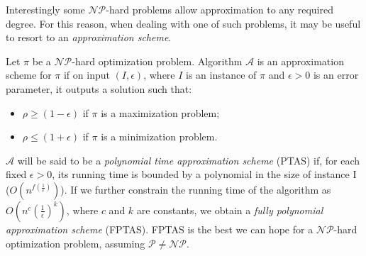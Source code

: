 Interestingly some $\mathcal{NP}$-hard problems allow approximation to any required degree. For this reason, when dealing with one of such problems, it may be useful to resort to an \textit{approximation scheme}.
\begin{definition}
	Let $\pi$ be a $\mathcal{NP}$-hard optimization problem. Algorithm $\mathcal{A}$ is an approximation scheme for $\pi$ if on input $(I,\epsilon)$, where $I$ is an instance of $\pi$ and $\epsilon> 0$ is an error parameter, it outputs a solution such that:
	\begin{itemize}
		\item $\rho\geq (1-\epsilon)$ if $\pi$ is a maximization problem;
		\item $\rho\leq (1+\epsilon)$ if $\pi$ is a minimization problem.
	\end{itemize}
\end{definition}
$\mathcal{A}$ will be said to be a \textit{polynomial time approximation scheme} (PTAS) if, for each fixed $\epsilon>0$, its running time is bounded by a polynomial in the size of instance I ($O(n^{f(\frac{1}{\epsilon})})$). If we further constrain the running time of the algorithm as $O(n^{c}(\frac{1}{\epsilon})^{k})$, where $c$ and $k$ are constants, we obtain a \textit{fully polynomial approximation scheme} (FPTAS). FPTAS is the best we can hope for a $\mathcal{NP}$-hard optimization problem, assuming $\mathcal{P}\neq \mathcal{NP}$.

